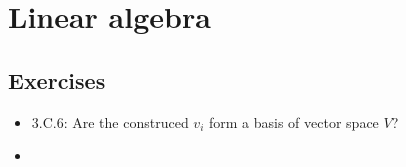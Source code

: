 \documentclass[../../note.tex]{subfiles}
\begin{document}
\chapter{Linear algebra}
\section{Exercises}
\begin{itemize}
    \item 3.C.6: Are the construced $v_i$ form a basis of vector space $V$?
    \item 
\end{itemize}
\end{document}
